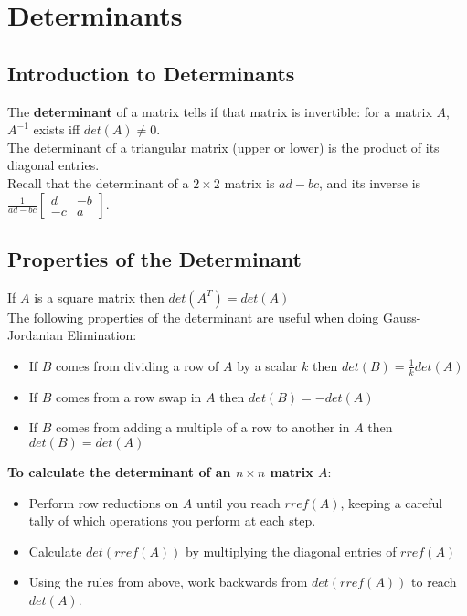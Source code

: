 \documentclass[]{scrartcl}
\begin{document}
	\setcounter{section}{5}
	\section{Determinants}
	\subsection{Introduction to Determinants}
	The \textbf{determinant} of a matrix tells if that matrix is invertible: for a matrix $A$, $A^{-1}$ exists iff $det(A) \neq 0$.\\
	
	The determinant of a triangular matrix (upper or lower) is the product of its diagonal entries.\\
	
	Recall that the determinant of a $2 \times 2$ matrix is $ad - bc$, and its inverse is $\frac{1}{ad-bc} \begin{bmatrix}
	d & -b\\
	-c & a
	\end{bmatrix}$.\\
	
	\subsection{Properties of the Determinant}
	If $A$ is a square matrix then $det(A^T) = det(A)$\\
	
	The following properties of the determinant are useful when doing Gauss-Jordanian Elimination:
	\begin{itemize}
		\item If $B$ comes from dividing a row of $A$ by a scalar $k$ then $det(B) = \frac{1}{k} det(A)$
		\item If $B$ comes from a row swap in $A$ then $det(B) = -det(A)$
		\item If $B$ comes from adding a multiple of a row to another in $A$ then $det(B) = det(A)$
	\end{itemize}
	
	\textbf{To calculate the determinant of an $n \times n$ matrix $A$}:
	\begin{itemize}
		\item Perform row reductions on $A$ until you reach $rref(A)$, keeping a careful tally of which operations you perform at each step.
		\item Calculate $det(rref(A))$ by multiplying the diagonal entries of $rref(A)$
		\item Using the rules from above, work backwards from $det(rref(A))$ to reach $det(A)$.
	\end{itemize}
	
\end{document}

